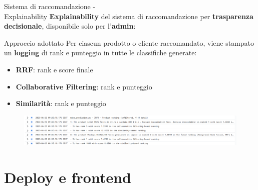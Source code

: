 \documentclass{beamer}
\begin{document}
	\begin{frame}{Sistema di raccomandazione -\\ Explainability}
		\textbf{Explainability} del sistema di raccomandazione per \textbf{trasparenza decisionale}, disponibile solo per l'\textbf{admin}:

		\begin{alertblock}{Approccio adottato}
			Per ciascun prodotto o cliente raccomandato, viene stampato un \textbf{logging} di rank e punteggio in tutte le classifiche generate:
			\begin{itemize}
				\item \textbf{RRF}: rank e score finale
				\item \textbf{Collaborative Filtering}: rank e punteggio
				\item \textbf{Similarità}: rank e punteggio
			\end{itemize}
		\end{alertblock}

		\begin{figure}
			\centering
			\includegraphics[width=\textwidth]{Explainability - Log della task Recommendation System.png}
		\end{figure}
	\end{frame}


	\section{Deploy e frontend}
\end{document}
